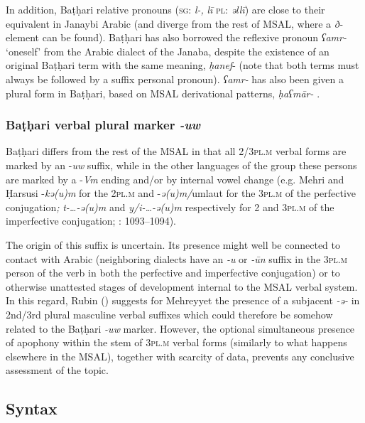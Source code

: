 \documentclass[output=paper]{langsci/langscibook}
\begin{document}
In addition, Baṭḥari relative pronouns (\textsc{sg}: \textit{l-,} \textit{lī} \textsc{pl}: \textit{əllī}) are close to their equivalent in Janaybi Arabic (and diverge from the rest of MSAL, where a \textit{ð-} element can be found). Baṭḥari has also borrowed the reflexive pronoun \textit{ʕamr-} ‘oneself’ from the Arabic dialect of the Janaba, despite the existence of an original Baṭḥari term with the same meaning, \textit{ḥanef}{}- (note that both terms must always be followed by a suffix personal pronoun). \textit{ʕamr-} has also been given a plural form in Baṭḥari, based on MSAL derivational patterns, \textit{ḥaʕmār-} \citep[14]{Morris2017}.


 \subsubsection{Baṭḥari verbal plural marker \textit{{}-uw}} 

Baṭḥari differs from the rest of the MSAL in that all 2/\textsc{3pl.m} verbal forms are marked by an -\textit{uw} suffix, while in the other languages of the group these persons are marked by a -\textit{Vm} ending and/or by internal vowel change (e.g. Mehri and Ḥarsusi -\textit{kə(u)m} for the \textsc{2pl.m} and -\textit{ə(u)m/}umlaut for the \textsc{3pl.m} of the perfective conjugation\textit{;} \textit{t-…-ə(u)m} and \textit{y/i-…-ə(u)m} respectively for 2 and \textsc{3pl.m} of the imperfective conjugation; \citealt{Simeone-Senelle2011}: 1093--1094). 

The origin of this suffix is uncertain. Its presence might well be connected to contact with Arabic (neighboring dialects have an \textit{{}-u} or \textit{{}-}\textit{ūn} suffix in the \textsc{3pl.m} person of the verb in both the perfective and imperfective conjugation) or to otherwise unattested stages of development internal to the MSAL verbal system. In this regard, Rubin (\citeyear[5]{Rubin2017}) suggests for {Mehreyyet} the presence of a subjacent \textit{{}-ə{}-} in 2nd/3rd plural masculine verbal suffixes which could therefore be somehow related to the Baṭḥari \textit{{}-uw} marker. However, the optional simultaneous presence of apophony within the stem of \textsc{3pl.m} verbal forms (similarly to what happens elsewhere in the MSAL), together with scarcity of data, prevents any conclusive assessment of the topic.


 
 \subsection{Syntax}\label{sec:key:syn}
\end{document}
